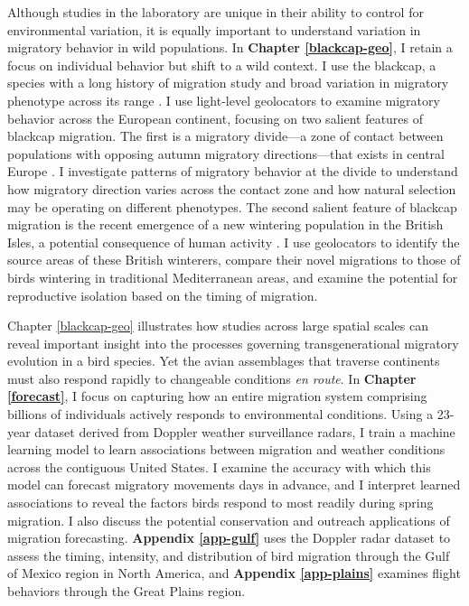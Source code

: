 \documentclass[a4paper, nobind]{templates/ociamthesis}
\begin{document}
Although studies in the laboratory are unique in their ability to control for environmental variation, it is equally important to understand variation in migratory behavior in wild populations. In \textbf{Chapter \ref{blackcap-geo}}, I retain a focus on individual behavior but shift to a wild context. I use the blackcap, a species with a long history of migration study and broad variation in migratory phenotype across its range \autocite{crampSylviaAtricapillaBlackcap1992}. I use light-level geolocators to examine migratory behavior across the European continent, focusing on two salient features of blackcap migration. The first is a migratory divide---a zone of contact between populations with opposing autumn migratory directions---that exists in central Europe \autocite{helbigInheritanceMigratoryDirection1991,helbigSESWmigratingBlackcap1991,helbigPopulationDifferentiationMigratory1992}. I investigate patterns of migratory behavior at the divide to understand how migratory direction varies across the contact zone and how natural selection may be operating on different phenotypes. The second salient feature of blackcap migration is the recent emergence of a new wintering population in the British Isles, a potential consequence of human activity \autocite{leachWinteringBlackcapsBritain1981,bertholdMigratoryBehaviourPopulation1988,bertholdRapidMicroevolutionMigratory1992,bearhopAssortativeMatingMechanism2005}. I use geolocators to identify the source areas of these British winterers, compare their novel migrations to those of birds wintering in traditional Mediterranean areas, and examine the potential for reproductive isolation based on the timing of migration.

Chapter \ref{blackcap-geo} illustrates how studies across large spatial scales can reveal important insight into the processes governing transgenerational migratory evolution in a bird species. Yet the avian assemblages that traverse continents must also respond rapidly to changeable conditions \emph{en route}. In \textbf{Chapter \ref{forecast}}, I focus on capturing how an entire migration system comprising billions of individuals actively responds to environmental conditions. Using a 23-year dataset derived from Doppler weather surveillance radars, I train a machine learning model to learn associations between migration and weather conditions across the contiguous United States. I examine the accuracy with which this model can forecast migratory movements days in advance, and I interpret learned associations to reveal the factors birds respond to most readily during spring migration. I also discuss the potential conservation and outreach applications of migration forecasting. \textbf{Appendix \ref{app-gulf}} uses the Doppler radar dataset to assess the timing, intensity, and distribution of bird migration through the Gulf of Mexico region in North America, and \textbf{Appendix \ref{app-plains}} examines flight behaviors through the Great Plains region.
\end{document}
